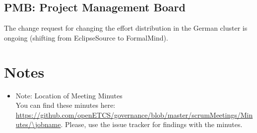\documentclass[a4paper, 11pt]{article}
\begin{document}
\subsection{PMB: Project Management Board}

The change request for changing the effort distribution in the German cluster is ongoing (shifting from EclipseSource to FormalMind). 
\section{Notes}
\begin{itemize}

\item Note: Location of Meeting Minutes\\
You can find these minutes here: \url{https://github.com/openETCS/governance/blob/master/scrumMeetings/Minutes/\jobname}. Please, use the issue tracker for findings with the minutes.

\end{itemize}
\end{document}

